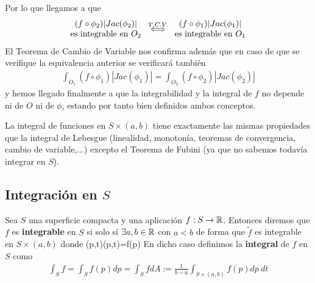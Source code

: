 Por lo que llegamos a que 
\begin{gather*}
    \begin{array}{c}
        (f \circ \phi_2)|Jac(\phi_2)|\\
        \text{es integrable en $O_2$}
    \end{array}
    \overset{T.C.V.}{\iff}
    \begin{array}{c}
        (f\circ \phi_1)|Jac(\phi_1)|\\
        \text{es integrable en $O_1$}
    \end{array}
\end{gather*}
El Teorema de Cambio de Variable nos confirma además que en caso de que se verifique la equivalencia anterior se verificará también
\begin{gather*}
    \int_{O_1} (f\circ \phi_1)|Jac(\phi_1)| = \int_{O_2} (f\circ \phi_2)|Jac(\phi_2)|
\end{gather*}
y hemos llegado finalmente a que la integrabilidad y la integral de $f$ no depende ni de $O$ ni de $\phi$, estando por tanto bien definidos ambos conceptos. 

\begin{observacion}
    La integral de funciones en $S\times(a,b)$ tiene exactamente las mismas propiedades que la integral de Lebesgue (linealidad, monotonía, teoremas de convergencia, cambio de variable,...) excepto el Teorema de Fubini (ya que no sabemos todavía integrar en $S$).
\end{observacion}

\subsection{Integración en $S$}

\begin{definicion}
    Sea $S$ una superficie compacta y una aplicación $f:S\to \mathbb{R}$. Entonces diremos que $f$ es \textbf{integrable} en $S$ si solo sí $\exists a,b\in \mathbb{R}$ con $a<b$ de forma que $\tilde{f}$ es integrable en $S\times(a,b)$ donde
         {(p,t)}{(p,t)=f(p)}
    En dicho caso definimos la \textbf{integral} de $f$ en $S$ como 
    \begin{gather*}
        \int_S f = \int_S f(p) dp = \int_S f dA := \frac{1}{b-a} \int_{S\times(a,b)} f(p) dp\ dt
    \end{gather*}
\end{definicion}

